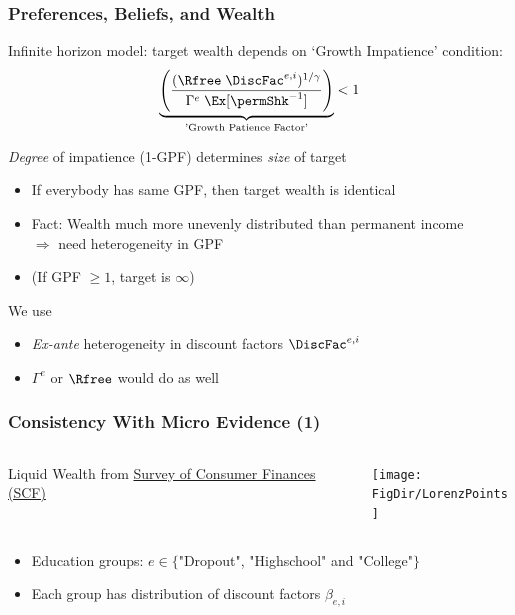 \documentclass[pdflatex,aspectratio=169]{beamer}
\renewcommand{\PermGroFac}{\Gamma}
\begin{document}
\begin{frame}
  \frametitle{Preferences, Beliefs, and Wealth}
  Infinite horizon model: target wealth depends on `Growth Impatience' condition:
\begin{equation}
  \underbrace{
    \left(
      \frac{(\Rfree \; \DiscFac^{e,i})^{1/\gamma}}
      {\PermGroFac^{e} \; \Ex[\permShk^{-1}]}
    \right)
    }_{\text{'Growth Patience Factor'}}
      < 1
    \end{equation}
    
  \pause 
  \emph{Degree} of impatience (1-GPF) determines \emph{size} of target
  \begin{itemize}[<+->]
	\item If everybody has same GPF, then target wealth is identical
	\item Fact: Wealth much more unevenly distributed than permanent income \\[1ex]
		 $\Rightarrow$ need heterogeneity in GPF
	\item (If GPF $\geq 1$, target is $\infty$)
  \end{itemize}

  \hypertarget{ConsistentWithMicroData}{}

  \pause
  We use
  \begin{itemize}[<+->]
  \item \textit{Ex-ante} heterogeneity in discount factors $\DiscFac^{e,i}$
  \item $\PermGroFac^{e}$ or $\Rfree$ would do as well
  \end{itemize}
  
\end{frame}

\begin{frame}
  \frametitle{Consistency With Micro Evidence (1)}
  \begin{columns}
    \begin{column}{0.3\linewidth}
      Liquid Wealth from \href{https://www.federalreserve.gov/econres/scfindex.htm}{Survey of Consumer Finances (SCF)}
	\end{column}	
	\begin{column}{0.7\linewidth}
	\texttt{[image: \\FigDir/LorenzPoints]}
    \end{column}
 \end{columns}
\medskip 
\begin{itemize}
	\item Education groups: $e\in\{$"Dropout", "Highschool" and "College"$\}$
	\item Each group has distribution of discount factors $\beta_{e,i}$
\end{itemize}	
\end{frame}
\end{document}
